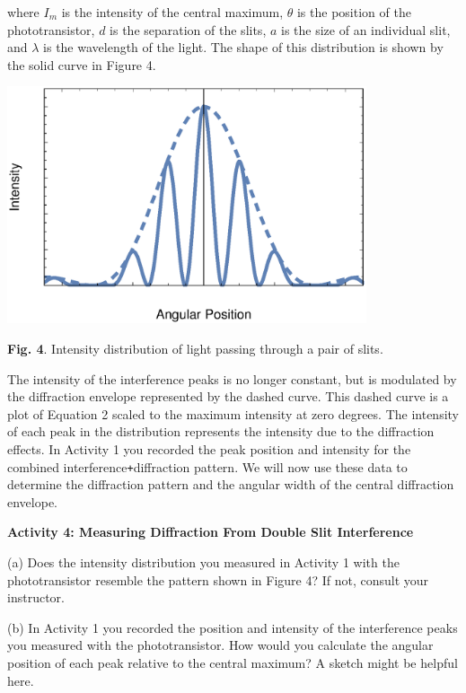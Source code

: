 where $I_{m}$ is the intensity of the central maximum, \( \theta  \)
is the position of the phototransistor, $d$ is the separation of the
slits, $a$ is the size of an individual slit, and \( \lambda  \) is
the wavelength of the light. The shape of this distribution is shown
by the solid curve in Figure 4.

\vspace{-0.1cm}
{\centering \includegraphics[height=2.75in]{diffraction/diffractionFig3.eps} \par}
\vspace{0.1cm}

{\centering \textbf{Fig. 4}. Intensity distribution of light passing
through a pair of slits.\par}

The intensity of the interference peaks is no longer constant, but
is modulated by the diffraction envelope represented by the dashed
curve. This dashed curve is a plot of Equation 2 scaled
to the maximum intensity at zero degrees. The intensity of each peak
in the distribution represents the intensity due to the diffraction
effects.  In Activity 1 you recorded the peak position and intensity
for the combined interference{\tt +}diffraction pattern.
We will now use these data to determine the
diffraction pattern and the angular width of the central diffraction
envelope.


\textbf{Activity 4: Measuring Diffraction From Double Slit Interference}

(a) Does the intensity distribution you measured in Activity 1 with the phototransistor
resemble the pattern shown in Figure 4? If not, consult your instructor.
\vspace{10mm}

(b) In Activity 1 you recorded the position and intensity of the interference
peaks you measured with the phototransistor. How would you calculate
the angular position of each peak relative to the central maximum?
A sketch might be helpful here.
\vspace{30mm}

